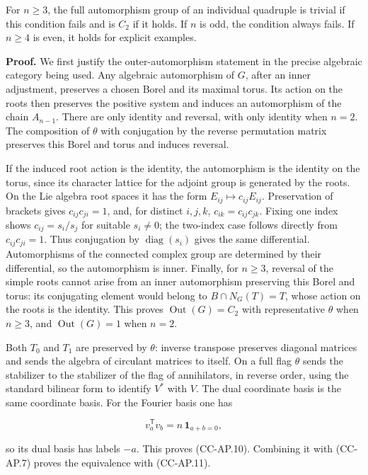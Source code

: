 \documentclass[11pt,a4paper]{article}
\theoremstyle{definition}\newtheorem{definition}[theorem]{Definition}
\theoremstyle{remark}\newtheorem{remark}[theorem]{Remark}
\begin{document}
For \(n\geq3\), the full automorphism group of an individual quadruple
is trivial if this condition fails and is \(C_2\) if it holds. If \(n\)
is odd, the condition always fails. If \(n\geq4\) is even, it holds for
explicit examples.

\textbf{Proof.} We first justify the outer-automorphism statement in the
precise algebraic category being used. Any algebraic automorphism of
\(G\), after an inner adjustment, preserves a chosen Borel and its
maximal torus. Its action on the roots then preserves the positive
system and induces an automorphism of the chain \(A_{n-1}\). There are
only identity and reversal, with only identity when \(n=2\). The
composition of \(\theta\) with conjugation by the reverse permutation
matrix preserves this Borel and torus and induces reversal.

If the induced root action is the identity, the automorphism is the
identity on the torus, since its character lattice for the adjoint group
is generated by the roots. On the Lie algebra root spaces it has the
form \(E_{ij}\mapsto c_{ij}E_{ij}\). Preservation of brackets gives
\(c_{ij}c_{ji}=1\), and, for distinct \(i,j,k\),
\(c_{ik}=c_{ij}c_{jk}\). Fixing one index shows \(c_{ij}=s_i/s_j\) for
suitable \(s_i\ne0\); the two-index case follows directly from
\(c_{ij}c_{ji}=1\). Thus conjugation by \(\operatorname{diag}(s_i)\)
gives the same differential. Automorphisms of the connected complex
group are determined by their differential, so the automorphism is
inner. Finally, for \(n\geq3\), reversal of the simple roots cannot
arise from an inner automorphism preserving this Borel and torus: its
conjugating element would belong to \(B\cap N_G(T)=T\), whose action on
the roots is the identity. This proves \(\operatorname{Out}(G)=C_2\)
with representative \(\theta\) when \(n\geq3\), and
\(\operatorname{Out}(G)=1\) when \(n=2\).

Both \(T_0\) and \(T_1\) are preserved by \(\theta\): inverse transpose
preserves diagonal matrices and sends the algebra of circulant matrices
to itself. On a full flag \(\theta\) sends the stabilizer to the
stabilizer of the flag of annihilators, in reverse order, using the
standard bilinear form to identify \(V^*\) with \(V\). The dual
coordinate basis is the same coordinate basis. For the Fourier basis one
has

\[
 v_a^{\mathsf T}v_b=n\,\mathbf 1_{a+b=0},
\]

so its dual basis has labels \(-a\). This proves (CC-AP.10). Combining
it with (CC-AP.7) proves the equivalence with (CC-AP.11).
\end{document}

